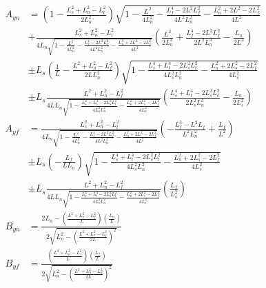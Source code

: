 \documentclass[11pt, landscape]{article}
\begin{document}
\begin{align}
  A_{yn} &= \left(1 - \frac{L_{s}^2+L_{n}^2-L_{t}^2}{2L_n^2}\right)\sqrt{1 - \frac{L^2}{4L_{n}^2} - \frac{L_f^4 - 2L^2L_f^2}{4L^2L^2_{n}} - \frac{L_n^2 + 2L^2 - 2L_f^2}{4L^2}}\\
    &+ \frac{L_{s}^2+L_{n}^2-L_{t}^2}{4L_{n}\sqrt{1 - \frac{L^2}{4L_{n}^2} - \frac{L_f^4 - 2L^2L_f^2}{4L^2L^2_{n}} - \frac{L_n^2 + 2L^2 - 2L_f^2}{4L^2}}}\left(\frac{L^2}{2L_n^3} + \frac{L_f^4 - 2L^2L_f^2}{2L^2L^3_n} - \frac{L_n}{2L^2}\right)\\
    &\pm L_s\left(\frac{1}{L} - \frac{L^2+L_{n}^2-L_{f}^2}{2LL_n^2}\right)\sqrt{1 - \frac{L_s^4 + L_t^4 - 2L_s^2L_t^2}{4L_s^2L_n^2} - \frac{L_n^2 + 2L_s^2 - 2L_f^2}{4L_s^2}}\\
    &\pm L_s\frac{L^2+L_{n}^2-L_{f}^2}{4LL_{n}\sqrt{1 - \frac{L_s^4 + L_t^4 - 2L_s^2L_t^2}{4L_s^2L_n^2} - \frac{L_n^2 + 2L_s^2 - 2L_f^2}{4L_s^2}}}\left(\frac{L_s^4 + L_t^4 - 2L_s^2L_t^2}{2L_s^2L_n^3} - \frac{L_n}{2L_s^2}\right)\\
  A_{yf} &= \frac{L_{s}^2+L_{n}^2-L_{t}^2}{4L_{n}\sqrt{1 - \frac{L^2}{4L_{n}^2} - \frac{L_f^4 - 2L^2L_f^2}{4L^2L^2_{n}} - \frac{L_n^2 + 2L^2 - 2L_f^2}{4L^2}}}\left(-\frac{L_f^3 - L^2L_f}{L^2L^2_{n}} + \frac{L_f}{L^2}\right)\\
    &\pm L_s\left(-\frac{L_f}{LL_{n}}\right)\sqrt{1 - \frac{L_s^4 + L_t^4 - 2L_s^2L_t^2}{4L_s^2L_n^2} - \frac{L_n^2 + 2L_s^2 - 2L_f^2}{4L_s^2}}\\
    &\pm L_s\frac{L^2+L_{n}^2-L_{f}^2}{4LL_{n}\sqrt{1 - \frac{L_s^4 + L_t^4 - 2L_s^2L_t^2}{4L_s^2L_n^2} - \frac{L_n^2 + 2L_s^2 - 2L_f^2}{4L_s^2}}}\left(\frac{L_f}{L_s^2}\right)\\
  B_{yn} &= \frac{2L_n - \left(\frac{L^2+L_n^2-L_f^2}{L}\right)\left(\frac{L_n}{L}\right)}{2\sqrt{L_n^2 - \left(\frac{L^2+L_n^2-L_f^2}{2L}\right)^2}}\\
  B_{yf} &= \frac{\left(\frac{L^2+L_n^2-L_f^2}{L}\right)\left(\frac{L_f}{L}\right)}{2\sqrt{L_n^2 - \left(\frac{L^2+L_n^2-L_f^2}{2L}\right)^2}}\\
\end{align}
\end{document}
